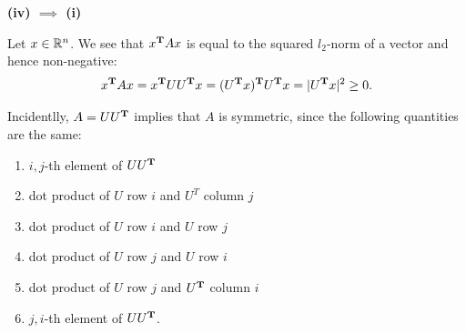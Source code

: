 \begin{enumerate}[label=(\alph*)]
\begin{mdframed}
      \textbf{(iv) $\implies$ (i)}

      Let $x \in \mathbb{R}^n$. We see that $x^{\mathbf{T}} Ax$ is equal to the squared
      $l_2$-norm of a vector and hence non-negative:
      \begin{align*}
        x^{\mathbf{T}} Ax = x^{\mathbf{T}} UU^{\mathbf{T}} x = (U^{\mathbf{T}} x)^{\mathbf{T}} U^{\mathbf{T}} x = |U^{\mathbf{T}} x|^2 \geq 0.
      \end{align*}

      Incidentlly, $A = UU^{\mathbf{T}}$ implies that $A$ is symmetric, since the
      following quantities are the same:
      \begin{enumerate}
      \item $i,j$-th element of $UU^{\mathbf{T}}$
      \item dot product of $U$ row $i$ and $U^T$ column $j$
      \item dot product of $U$ row $i$ and $U$ row $j$
      \item dot product of $U$ row $j$ and $U$ row $i$
      \item dot product of $U$ row $j$ and $U^{\mathbf{T}}$ column $i$
      \item $j,i$-th element of $UU^{\mathbf{T}}$.
      \end{enumerate}

    \end{mdframed}


\end{enumerate}
